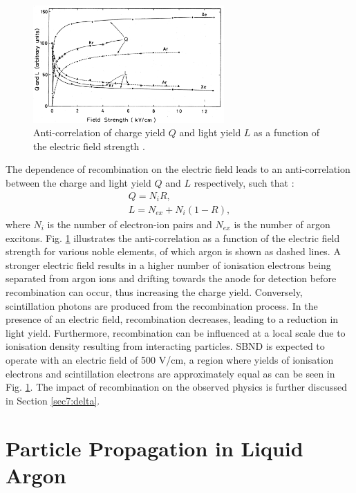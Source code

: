 \begin{figure}[b!] 
\centering    
\includegraphics[width=0.65\textwidth]{QLAnti}
\caption[Charge and Light Yield as a Function of Electric Field]{
Anti-correlation of charge yield $Q$ and light yield $L$ as a function of the electric field strength \cite{QLAnti}.
}
\label{fig:QLAnti}
\end{figure}

The dependence of recombination on the electric field leads to an anti-correlation between the charge and light yield $Q$ and $L$ respectively, such that \cite{argoneut_recomb}:
\begin{gather}
        \label{eq:Q}
        Q = N_{i}R, \\ 
        \label{eq:L}
        L = N_{ex} + N_{i}(1 - R),
\end{gather}
where $N_{i}$ is the number of electron-ion pairs and $N_{ex}$ is the number of argon excitons.
Fig. \ref{fig:QLAnti} illustrates the anti-correlation as a function of the electric field strength for various noble elements, of which argon is shown as dashed lines.
A stronger electric field results in a higher number of ionisation electrons being separated from argon ions and drifting towards the anode for detection before recombination can occur, thus increasing the charge yield. 
Conversely, scintillation photons are produced from the recombination process.
In the presence of an electric field, recombination decreases, leading to a reduction in light yield.
Furthermore, recombination can be influenced at a local scale due to ionisation density resulting from interacting particles.
SBND is expected to operate with an electric field of 500 V/cm, a region where yields of ionisation electrons and scintillation electrons are approximately equal as can be seen in Fig. \ref{fig:QLAnti}.
The impact of recombination on the observed physics is further discussed in Section \ref{sec7:delta}.

\section{Particle Propagation in Liquid Argon}
\label{sec3:propagation}

